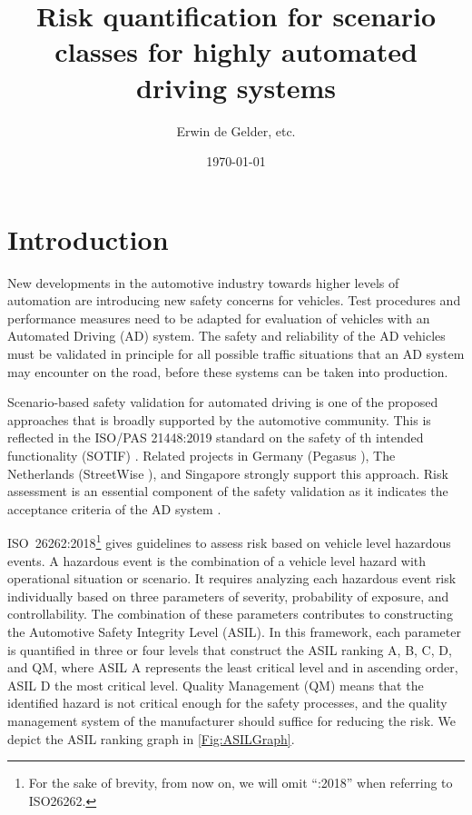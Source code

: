 \documentclass[10pt,final,a4paper,oneside,onecolumn]{article}
\def\reptitle{Risk quantification for scenario classes for highly automated driving systems}
\def\repauthor{Erwin de Gelder, etc.}
\theoremstyle{plain}\newtheorem{definition}{Definition}[section]    %
\theoremstyle{definition}\newtheorem{example}{Example}[section]     %
\theoremstyle{remark}\newtheorem{remarkenv}{Remark}[section]        %
\begin{document}

\title{\textbf{\reptitle}}
\author{\repauthor}
\date{\today}
\maketitle

\tableofcontents

\newpage

\section{Introduction}
\label{sec:introduction}

New developments in the automotive industry towards higher levels of automation are introducing new safety concerns for vehicles. Test procedures and performance measures need to be adapted for evaluation of vehicles with an Automated Driving (AD) system. The safety and reliability of the AD vehicles must be validated in principle for all possible traffic situations that an AD system may encounter on the road, before these systems can be taken into production.

Scenario-based safety validation for automated driving is one of the proposed approaches that is broadly supported by the automotive community. This is reflected in the ISO/PAS 21448:2019 standard on the safety of th intended functionality (SOTIF) \cite{ISO21448}. Related projects in Germany (Pegasus \cite{putz2017pegasus}), The Netherlands (StreetWise \cite{elrofai2018scenario}), and Singapore \cite{ploeg2018cetran} strongly support this approach. Risk assessment is an essential component of the safety validation as it indicates
the acceptance criteria of the AD system \cite{degelder2019risk}.

ISO~26262:2018\footnote{For the sake of brevity, from now on, we will omit ``:2018'' when referring to ISO26262.} \cite{ISO26262} gives guidelines to assess risk based on vehicle level hazardous events. A hazardous event is the combination of a vehicle level hazard with operational situation or scenario. It requires analyzing each hazardous event risk individually based on three parameters of severity, probability of exposure, and controllability. The combination of these parameters contributes to constructing the Automotive Safety Integrity Level (ASIL). In this framework, each parameter is quantified in three or four levels that construct the ASIL ranking A, B, C, D, and QM, where ASIL A represents the least critical level and in ascending order, ASIL D the most critical level. Quality Management (QM) means that the identified hazard is not critical enough for the safety processes, and the quality management system of the manufacturer should suffice for reducing the risk. We depict the ASIL ranking graph in \cref{Fig:ASILGraph}. 
\end{document}
